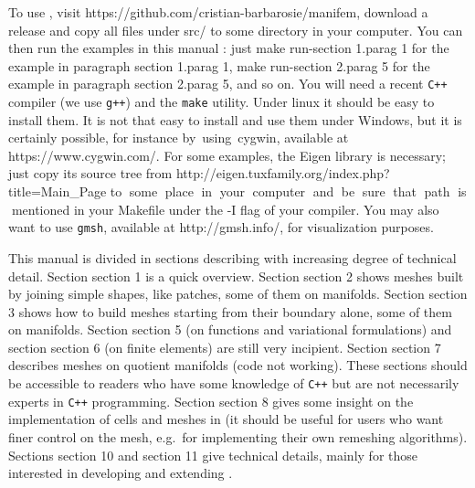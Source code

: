 To use \maniFEM, visit {\codett https://github.com/cristian-barbarosie/manifem},
download a release and copy all files under {\codett src/} to some directory in your computer.
You can then run the examples in this manual :
just {\codett make run-\numb section 1.\numb parag 1}
for the example in paragraph \numb section 1.\numb parag 1,
{\codett make run-\numb section 2.\numb parag 5} for the example
in paragraph \numb section 2.\numb parag 5, and so on.
You will need a recent {\tt C++} compiler (we use {\tt g++}) and the {\tt make} utility.
Under linux it should be easy to install them.
It is not that easy to install and use them under Windows, but it is certainly possible,
for instance \hbox{by using {\codett cygwin}}, available at {\codett https://www.cygwin.com/}.
For some examples, the {\codett Eigen} library is necessary; just copy its source tree
from {\codett http://eigen.tuxfamily.org/index.php?title=Main\_Page}
to $\;$some $\;$place $\;$in $\;$your $\;$computer $\;$and $\;$be $\;$sure $\;$that
$\;$path $\;$is $\;$mentioned in your {\codett Makefile}
under the {\codett -I} flag of your compiler.
You may also want to use {\tt gmsh}, available at {\codett http://gmsh.info/},
for visualization purposes.

This manual is divided in sections describing {\maniFEM} with increasing degree of technical
detail.
Section \numb section 1 is a quick overview.
Section \numb section 2 shows meshes built by joining simple shapes, like patches,
some of them on manifolds.
Section \numb section 3 shows how to build meshes starting from their boundary alone,
some of them on manifolds.
Section \numb section 5 (on functions and variational formulations) and
section \numb section 6 (on finite elements) are still very incipient.
Section \numb section 7 describes meshes on quotient manifolds (code not working).
These sections should be accessible to readers who have some knowledge of {\tt C++}
but are not necessarily experts in {\tt C++} programming.
Section \numb section 8 gives some insight on the implementation of cells and meshes in
{\maniFEM} (it should be useful for users who want finer control on the mesh,
e.g.~for implementing their own remeshing algorithms).
Sections \numb section 10 and \numb section 11 give technical details, mainly for those
interested in developing and extending \maniFEM.




